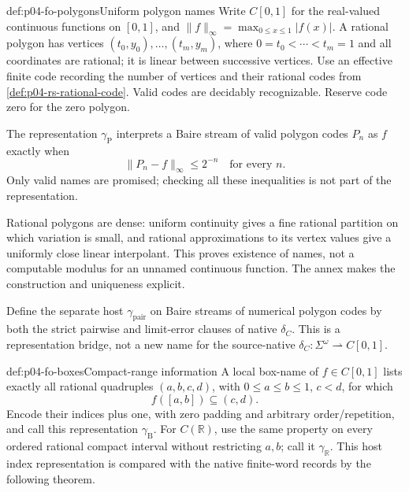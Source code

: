\begin{hbdefinition}{def:p04-fo-polygons}{Uniform polygon names}
Write \(C[0,1]\) for the real-valued continuous functions on
\([0,1]\), and
\(\lVert f\rVert_\infty=\max_{0\leq x\leq1}\lvert f(x)\rvert\).
A rational polygon has vertices
\((t_0,y_0),\ldots,(t_m,y_m)\), where
\(0=t_0<\cdots<t_m=1\) and all coordinates are rational;
it is linear between successive vertices.
Use an effective finite code recording the number of vertices
and their rational codes from \cref{def:p04-rs-rational-code}.
Valid codes are decidably recognizable. Reserve code zero for
the zero polygon.

The representation \(\gamma_{\mathrm P}\) interprets a Baire
stream of valid polygon codes \(P_n\) as \(f\) exactly when
\[
 \lVert P_n-f\rVert_\infty\leq2^{-n}\quad\text{for every }n.
\]
Only valid names are promised; checking all these inequalities
is not part of the representation.
\end{hbdefinition}

Rational polygons are dense: uniform continuity gives a fine
rational partition on which variation is small, and rational
approximations to its vertex values give a uniformly close
linear interpolant. This proves existence of names, not a
computable modulus for an unnamed continuous function.
The annex makes the construction and uniqueness explicit.

Define the separate host \(\gamma_{\mathrm{pair}}\) on
Baire streams of numerical polygon codes by both the strict
pairwise and limit-error clauses of native \(\delta_C\).
This is a representation bridge, not a new name for the
source-native \(\delta_C:\Sigma^\omega\rightharpoonup C[0,1]\).

\begin{hbdefinition}{def:p04-fo-boxes}{Compact-range information}
A local box-name of \(f\in C[0,1]\) lists exactly all rational
quadruples \((a,b,c,d)\), with
\(0\leq a\leq b\leq1\), \(c<d\), for which
\[
 f([a,b])\subseteq(c,d).
\]
Encode their indices plus one, with zero padding and arbitrary
order/repetition, and call this representation
\(\gamma_{\mathrm B}\).
For \(C(\mathbb R)\), use the same property on every ordered
rational compact interval without restricting \(a,b\);
call it \(\gamma_{\mathbb R}\).
This host index representation is compared with the native
finite-word records by the following theorem.
\end{hbdefinition}

